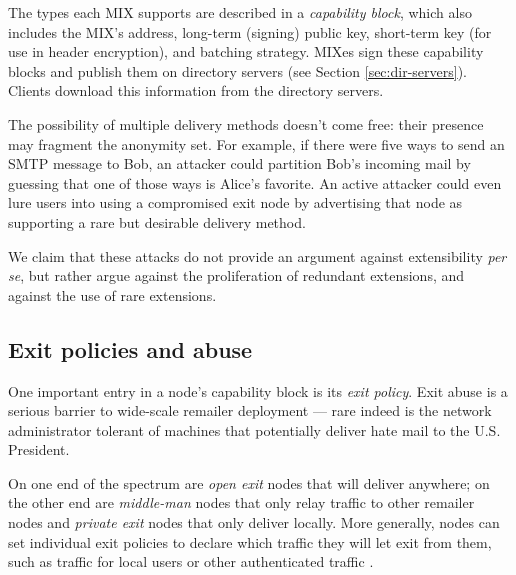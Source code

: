 \documentclass{llncs}
\begin{document}
The types each MIX supports are described in a \emph{capability block},
which also includes the MIX's address, long-term (signing) public key,
short-term key (for use in header encryption), and batching strategy.
MIXes sign these capability blocks
and publish them on directory servers (see Section \ref{sec:dir-servers}).
Clients download this information from the directory servers.

%

The possibility of multiple delivery methods doesn't come free: their
presence may fragment the anonymity set.  For example, if there were five
ways to send an SMTP message to Bob, an attacker could partition Bob's
incoming mail by guessing that one of those ways is Alice's favorite.
An active attacker could even lure users into using a compromised
exit node by advertising that node as supporting a
rare but desirable delivery method.

We claim that these attacks do not provide an argument against
extensibility \emph{per se}, but rather argue against the proliferation
of redundant extensions, and against the use of rare extensions.  

\subsection{Exit policies and abuse}
\label{subsec:exitpolicies}

One important entry in a node's capability block is its \emph{exit
policy}. Exit abuse is a serious barrier to wide-scale remailer deployment
--- rare indeed is the network administrator tolerant of machines that
potentially deliver hate mail to the U.S. President.

On one end of the spectrum are \emph{open exit} nodes that will
deliver anywhere; on the other end are \emph{middle-man} nodes that
only relay traffic to other remailer nodes and \emph{private exit}
nodes that only deliver locally. More generally, nodes can set
individual exit policies to declare which traffic they will let exit
from them, such as traffic for local users or other authenticated
traffic \cite{onion-discex00}.
\end{document}
